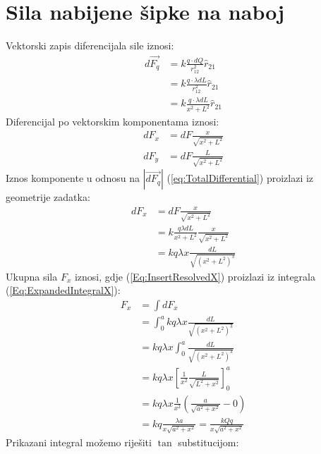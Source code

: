 \documentclass{article}
\let\oldref\ref
\renewcommand{\ref}[1]{(\oldref{#1})}
\begin{document}
\section*{Sila nabijene šipke na naboj}
Vektorski zapis diferencijala sile iznosi:
\begin{align}
  d\vec{F_q} & =k\frac{q \cdot dQ}{r_{12}^2}\hat{r}_{21}         \\
             & =k\frac{q \cdot \lambda dL}{r_{12}^2}\hat{r}_{21} \\
  \label{eq:TotalDifferential}
             & =k\frac{q\cdot \lambda dL}{x^2+L^2}\hat{r}_{21}
\end{align}
Diferencijal po vektorskim komponentama iznosi:
\begin{align}
  dF_x & = dF\frac{x}{\sqrt{x^2+L^2}} \\
  dF_y & = dF\frac{L}{\sqrt{x^2+L^2}}
\end{align}
Iznos komponente u odnosu na $|\vec{dF_q}|$ \ref{eq:TotalDifferential} proizlazi iz geometrije zadatka:
\begin{align}
  dF_x & = dF\frac{x}{\sqrt{x^2+L^2}}                            \\
       & = k\frac{q \lambda dL}{x^2+L^2}\frac{x}{\sqrt{x^2+L^2}} \\
       & = kq{\lambda}x\frac{dL}{\sqrt{(x^2+L^2)^3}}
\end{align}
Ukupna sila $F_x$ iznosi, gdje \ref{Eq:InsertResolvedX} proizlazi iz integrala \ref{Eq:ExpandedIntegralX}:
\begin{align}
  F_x & = \int dF_x                                                          \\
      & = \int_{0}^{a} kq{\lambda}x\frac{dL}{\sqrt{(x^2+L^2)^3}}             \\
      & = kq{\lambda}x\int_{0}^{a}\frac{dL}{\sqrt{(x^2+L^2)^3}}              \\
  \label{Eq:InsertResolvedX}
      & = kq{\lambda}x\left[\frac{1}{x^2}\frac{L}{\sqrt{L^2+x^2}}\right]_0^a \\
      & = kq{\lambda}x\frac{1}{x^2}\left(\frac{a}{\sqrt{a^2+x^2}} - 0\right) \\
      & = kq\frac{{\lambda}a}{x\sqrt{a^2+x^2}} = \frac{kQq}{x\sqrt{a^2+x^2}}
\end{align}
Prikazani integral možemo riješiti $\tan$ substitucijom:
\end{document}
